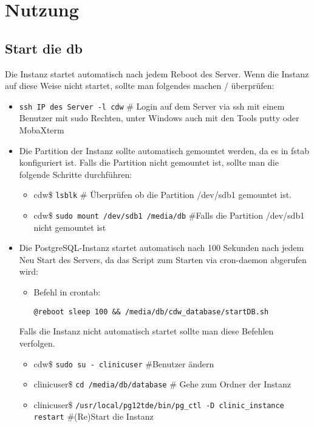 \chapter{Nutzung}
	   \section{Start die \acs{db}}
	   Die Instanz startet automatisch nach jedem Reboot des Server. Wenn die Instanz auf diese Weise nicht startet, sollte man folgendes machen / überprüfen:
	   \begin{itemize}
	   	\item \texttt{ssh IP des Server -l cdw} \# Login auf dem Server via ssh mit einem Benutzer mit sudo Rechten, unter Windows auch mit den Tools putty oder MobaXterm
	   	\item Die Partition der Instanz sollte automatisch gemountet werden, da es in fstab konfiguriert ist. Falls die Partition nicht gemountet ist, sollte man die folgende Schritte durchführen:
	   	\begin{itemize}
	   	 \item cdw\$ \texttt{lsblk} \# Überprüfen ob die Partition /dev/sdb1 gemountet ist.
	   	 \item cdw\$ \texttt{sudo mount /dev/sdb1 /media/db} \#Falls die Partition /dev/sdb1 nicht gemountet ist
	   	\end{itemize}	   	  
	   	\item Die PostgreSQL-Instanz startet automatisch nach 100 Sekunden nach jedem Neu Start des Servers, da das Script zum Starten via cron-daemon abgerufen wird:
	   	\begin{itemize}
	   		\item Befehl in crontab: 
	   		
	   		\texttt{@reboot sleep 100 \&\& /media/db/cdw\_database/startDB.sh}
	   	\end{itemize}
	   	Falls die Instanz nicht automatisch startet sollte man diese Befehlen verfolgen.
	   	\begin{itemize}
	   		\item cdw\$ \texttt{sudo su - clinicuser} \#Benutzer ändern
	   		\item clinicuser\$ \texttt{cd /media/db/database} \# Gehe zum Ordner der  Instanz
	   	    \item clinicuser\$ \texttt{/usr/local/pg12tde/bin/pg\_ctl -D clinic\_instance  restart} \#(Re)Start die Instanz
	   	\end{itemize}
	   \end{itemize}
